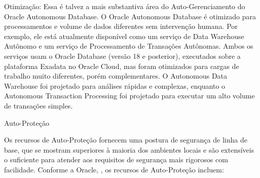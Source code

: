 \begin{alineas}
\item Otimização: Essa é talvez a mais substantiva área do Auto-Gerenciamento do Oracle Autonomous Database. O Oracle Autonomous Database é otimizado para processamentos e volume de dados diferentes sem intervenção humana. Por exemplo, ele está atualmente disponível como um serviço de Data Warehouse Autônomo e um serviço de Processamento de Transações Autônomas. Ambos os serviços usam o Oracle Database (versão 18 e posterior), executados sobre a plataforma Exadata no Oracle Cloud, mas foram otimizados para cargas de trabalho muito diferentes, porém complementares. O Autonomous Data Warehouse foi projetado para análises rápidas e complexas, enquanto o Autonomous Transaction Processing foi projetado para executar um alto volume de transações simples.
\end{alineas}


Auto-Proteção


Os recursos de Auto-Proteção fornecem uma postura de segurança de linha de base, que se mostram superiores à maioria dos ambientes locais e são extensíveis o suficiente para atender aos requisitos de segurança mais rigorosos com facilidade. Conforme a Oracle, \cite{WPProtecao}, os recursos de Auto-Proteção incluem:


